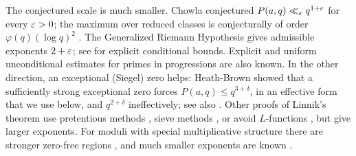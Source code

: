 The conjectured scale is much smaller. Chowla \cite{Chowla1934least} conjectured
$P(a,q)\ll_\varepsilon q^{1+\varepsilon}$ for every $\varepsilon>0$; the maximum over reduced classes is
conjecturally of order $\varphi(q)(\log q)^2$
\cite{Wagstaff1979greatest,Pomerance1980note,GranvillePomerance1990least,LiPrattShakan2017lower}.
The Generalized Riemann Hypothesis gives admissible exponents $2+\varepsilon$; see
\cite{BachSorenson1996explicit,LamzouriLiSoundararajan2015conditional,CarneiroMilinovichQuesadaHerreraRamos2025fourier}
for explicit conditional bounds. Explicit \cite{BennettMartinOBryantRechnitzer2018explicit} and
uniform \cite{ThornerZaman2024refinements} unconditional estimates for primes in progressions are
also known. In the other direction, an exceptional (Siegel) zero helps: Heath-Brown
\cite{HeathBrown1990siegel} showed that a sufficiently strong exceptional zero forces
$P(a,q)\le q^{3+\delta}$, in an effective form that we use below, and $q^{2+\delta}$ ineffectively; see also
\cite{FriedlanderIwaniec2003exceptional,Iwaniec2006conversations,Zaman2016least}. Other proofs of
Linnik's theorem use pretentious methods \cite{Sachpazis2023pretentious}, sieve methods
\cite{FriedlanderIwaniec2023sifting}, or avoid $L$-functions
\cite{MatomakiMerikoskiTeravainen2024primes}, but give larger exponents. For moduli with special
multiplicative structure there are stronger zero-free regions
\cite{BarbanLinnikChudakov1964prime,Gallagher1972primes,Iwaniec1974zeros}, and much smaller
exponents are known \cite{Chang2014short}.

